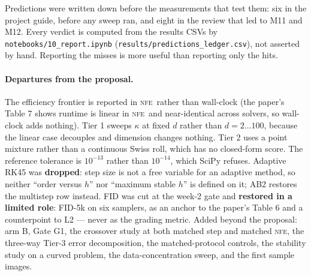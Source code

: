 \documentclass[11pt,a4paper]{article}
\newcommand{\NFE}{\textsc{nfe}}
\begin{document}
Predictions were written down before the measurements that test them: six in the
project guide, before any sweep ran, and eight in the review that led to M11 and
M12. Every verdict is computed from the results CSVs by
\texttt{notebooks/10\_report.ipynb} (\texttt{results/predictions\_ledger.csv}),
not asserted by hand. Reporting the misses is more useful than reporting only the
hits.

\paragraph{Departures from the proposal.} The efficiency frontier is reported in
\NFE\ rather than wall-clock (the paper's Table 7 shows runtime is linear in \NFE\
and near-identical across solvers, so wall-clock adds nothing). Tier 1 sweeps
$\kappa$ at fixed $d$ rather than $d = 2\dots100$, because the linear case
decouples and dimension changes nothing. Tier 2 uses a point mixture rather than a
continuous Swiss roll, which has no closed-form score. The reference tolerance is
$10^{-13}$ rather than $10^{-14}$, which SciPy refuses. Adaptive RK45 was
\textbf{dropped}: step size is not a free variable for an adaptive method, so
neither ``order versus $h$'' nor ``maximum stable $h$'' is defined on it; AB2
restores the multistep row instead. FID was cut at the week-2 gate and
\textbf{restored in a limited role}: FID-5k on six samplers, as an anchor to the
paper's Table 6 and a counterpoint to L2 --- never as the grading metric. Added
beyond the proposal: arm B, Gate G1, the crossover study at both matched step and
matched \NFE, the three-way Tier-3 error decomposition, the matched-protocol
controls, the stability study on a curved problem, the data-concentration sweep,
and the first sample images.
\end{document}
